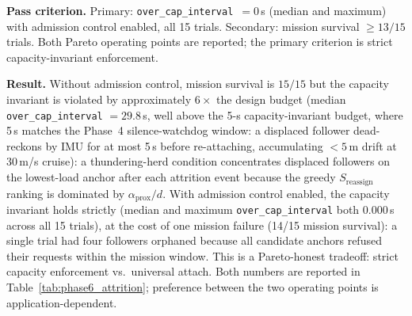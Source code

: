 \documentclass[journal,10pt,twocolumn]{IEEEtran}
\begin{document}
\textbf{Pass criterion.} Primary: \texttt{over\_cap\_interval}~$=0$\,s (median and maximum) with admission control enabled, all 15 trials. Secondary: mission survival $\geq 13/15$ trials. Both Pareto operating points are reported; the primary criterion is strict capacity-invariant enforcement.

\textbf{Result.} Without admission control, mission survival is $15/15$ but the capacity invariant is violated by approximately $6\times$ the design budget (median \texttt{over\_cap\_interval} $=29.8$\,s, well above the 5-s capacity-invariant budget, where 5\,s matches the Phase~4 silence-watchdog window: a displaced follower dead-reckons by IMU for at most 5\,s before re-attaching, accumulating $<5$\,m drift at 30\,m/s cruise): a thundering-herd condition concentrates displaced followers on the lowest-load anchor after each attrition event because the greedy $S_\text{reassign}$ ranking is dominated by $\alpha_\text{prox}/d$. With admission control enabled, the capacity invariant holds strictly (median and maximum \texttt{over\_cap\_interval} both $0.000$\,s across all 15 trials), at the cost of one mission failure (14/15 mission survival): a single trial had four followers orphaned because all candidate anchors refused their requests within the mission window. This is a Pareto-honest tradeoff: strict capacity enforcement vs.\ universal attach. Both numbers are reported in Table~\ref{tab:phase6_attrition}; preference between the two operating points is application-dependent.

\begin{table}[t]
\centering
\caption{Phase~6 progressive-attrition Tier~B results ($N=50$, $M=10$, three anchor kills, 15 trials). Admission control trades one mission failure for strict capacity-invariant enforcement.}
\label{tab:phase6_attrition}
\small
{}
\end{table}
\end{document}
